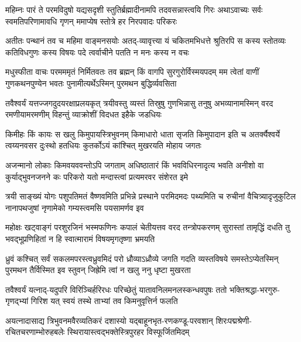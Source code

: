 
\fourlineindentedshloka
{महिम्नः पारं ते परमविदुषो यद्यसदृशी}
{स्तुतिर्ब्रह्मादीनामपि तदवसन्नास्त्वयि गिरः}
{अथाऽवाच्यः सर्वः स्वमतिपरिणामावधि गृणन्}
{ममाप्येष स्तोत्रे हर निरपवादः परिकरः}%

\fourlineindentedshloka
{अतीतः पन्थानं तव च महिमा वाङ्मनसयोः}
{अतद्-व्यावृत्त्या यं चकितमभिधत्ते श्रुतिरपि}
{स कस्य स्तोतव्यः कतिविधगुणः कस्य विषयः}
{पदे त्वर्वाचीने पतति न मनः कस्य न वचः}%

\fourlineindentedshloka
{मधुस्फीता वाचः परमममृतं निर्मितवतः}
{तव ब्रह्मन् किं वागपि सुरगुरोर्विस्मयपदम्}
{मम त्वेतां वाणीं गुणकथनपुण्येन भवतः}
{पुनामीत्यर्थेऽस्मिन् पुरमथन बुद्धिर्व्यवसिता}%

\fourlineindentedshloka
{तवैश्वर्यं यत्तज्जगदुदयरक्षाप्रलयकृत्}
{त्रयीवस्तु व्यस्तं तिस्रुषु गुणभिन्नासु तनुषु}
{अभव्यानामस्मिन् वरद रमणीयामरमणीम्}
{विहन्तुं व्याक्रोशीं विदधत इहैके जडधियः}%

\fourlineindentedshloka
{किमीहः किं कायः स खलु किमुपायस्त्रिभुवनम्}
{किमाधारो धाता सृजति किमुपादान इति च}
{अतर्क्यैश्वर्ये त्वय्यनवसर दुःस्थो हतधियः}
{कुतर्कोऽयं कांश्चित् मुखरयति मोहाय जगतः}%

\fourlineindentedshloka
{अजन्मानो लोकाः किमवयववन्तोऽपि जगताम्}
{अधिष्ठातारं किं भवविधिरनादृत्य भवति}
{अनीशो वा कुर्याद्भुवनजनने कः परिकरो}
{यतो मन्दास्त्वां प्रत्यमरवर संशेरत इमे}%

\fourlineindentedshloka
{त्रयी साङ्ख्यं योगः पशुपतिमतं वैष्णवमिति}
{प्रभिन्ने प्रस्थाने परमिदमदः पथ्यमिति च}
{रुचीनां वैचित्र्यादृजुकुटिल नानापथजुषां}
{नृणामेको गम्यस्त्वमसि पयसामर्णव इव}%

\fourlineindentedshloka
{महोक्षः खट्वाङ्गं परशुरजिनं भस्मफणिनः}
{कपालं चेतीयत्तव वरद तन्त्रोपकरणम्}
{सुरास्तां तामृद्धिं दधति तु भवद्भूप्रणिहितां}
{न हि स्वात्मारामं विषयमृगतृष्णा भ्रमयति}%

\fourlineindentedshloka
{ध्रुवं कश्चित् सर्वं सकलमपरस्त्वध्रुवमिदं}
{परो ध्रौव्याऽध्रौव्ये जगति गदति व्यस्तविषये}
{समस्तेऽप्येतस्मिन् पुरमथन तैर्विस्मित इव}
{स्तुवन् जिह्रेमि त्वां न खलु ननु धृष्टा मुखरता}%

\fourlineindentedshloka
{तवैश्वर्यं यत्नाद्-यदुपरि विरिञ्चिर्हरिरधः}
{परिच्छेतुं यातावनिलमनलस्कन्धवपुषः}
{ततो भक्तिश्रद्धा-भरगुरु-गृणद्भ्यां गिरिश यत्}
{स्वयं तस्थे ताभ्यां तव किमनुवृत्तिर्न फलति}%

\fourlineindentedshloka
{अयत्नादासाद्य त्रिभुवनमवैरव्यतिकरं}
{दशास्यो यद्बाहूनभृत-रणकण्डू-परवशान्}
{शिरःपद्मश्रेणी-रचितचरणाम्भोरुहबलेः}
{स्थिरायास्त्वद्भक्तेस्त्रिपुरहर विस्फूर्जितमिदम्}%

